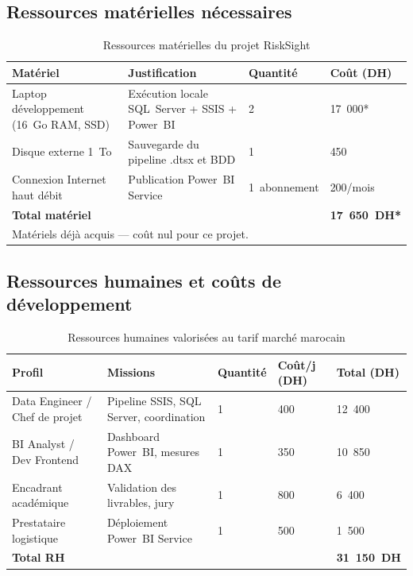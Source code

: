 \documentclass[12pt, a4paper]{report}
\begin{document}
\subsection{Ressources matérielles nécessaires}

\begin{table}[H]
\centering
\caption{Ressources matérielles du projet RiskSight}
\label{tab:materiel}
\renewcommand{\arraystretch}{1.3}
\begin{tabularx}{\textwidth}{X p{4.5cm} p{2cm} p{2cm}}
\toprule
\rowcolor{primary!12}
Matériel & Justification & Quantité & Coût (DH) \\
\midrule
Laptop développement
(16~Go RAM, SSD) & Exécution locale SQL~Server + SSIS + Power~BI & 2 & 17~000* \\
Disque externe 1~To & Sauvegarde du pipeline .dtsx et BDD & 1 & 450 \\
Connexion Internet haut débit & Publication Power~BI Service & 1~abonnement & 200/mois \\
\midrule
\textbf{Total matériel} & & & \textbf{17~650~DH*} \\
\bottomrule
\multicolumn{4}{l}{\footnotesize * Matériels déjà acquis --- coût nul pour ce projet.}
\end{tabularx}
\end{table}

\subsection{Ressources humaines et coûts de développement}

\begin{table}[H]
\centering
\caption{Ressources humaines valorisées au tarif marché marocain}
\label{tab:rh}
\renewcommand{\arraystretch}{1.3}
\begin{tabularx}{\textwidth}{p{4cm} X p{1.5cm} p{1.8cm} p{2cm}}
\toprule
\rowcolor{primary!12}
Profil & Missions & Quantité & Coût/j (DH) & Total (DH) \\
\midrule
Data Engineer / Chef de projet & Pipeline SSIS, SQL Server, coordination & 1 & 400 & 12~400 \\
BI Analyst / Dev Frontend & Dashboard Power~BI, mesures DAX & 1 & 350 & 10~850 \\
Encadrant académique & Validation des livrables, jury & 1 & 800 & 6~400 \\
Prestataire logistique & Déploiement Power~BI Service & 1 & 500 & 1~500 \\
\midrule
\textbf{Total RH} & & & & \textbf{31~150~DH} \\
\bottomrule
\end{tabularx}
\end{table}
\end{document}
